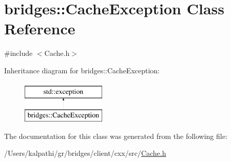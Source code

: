 \hypertarget{classbridges_1_1_cache_exception}{}\section{bridges\+:\+:Cache\+Exception Class Reference}
\label{classbridges_1_1_cache_exception}


{\ttfamily \#include $<$Cache.\+h$>$}

Inheritance diagram for bridges\+:\+:Cache\+Exception\+:\begin{figure}[H]
\begin{center}
\leavevmode
\includegraphics[height=2.000000cm]{classbridges_1_1_cache_exception}
\end{center}
\end{figure}


The documentation for this class was generated from the following file\+:\begin{DoxyCompactItemize}
\item 
/\+Users/kalpathi/gr/bridges/client/cxx/src/\mbox{\hyperlink{_cache_8h}{Cache.\+h}}\end{DoxyCompactItemize}
